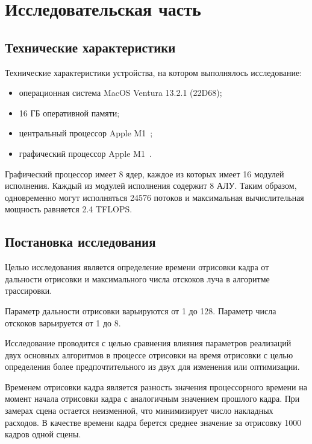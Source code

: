 \chapter{Исследовательская часть}

\section{Технические характеристики}

Технические характеристики устройства, на котором выполнялось исследование:
\begin{itemize}
    \item операционная система MacOS Ventura 13.2.1 (22D68);
    \item 16 ГБ оперативной памяти;
    \item центральный процессор Apple M1~\cite{M1};
    \item графический процессор Apple M1~\cite{M1}.
\end{itemize}

Графический процессор имеет 8 ядер, каждое из которых имеет 16 модулей 
исполнения. Каждый из модулей исполнения содержит 8 АЛУ. Таким образом, 
одновременно могут исполняться 24576 потоков и максимальная вычислительная мощность
равняется 2.4 TFLOPS.


\section{Постановка исследования}

Целью исследования является определение времени отрисовки кадра 
от дальности отрисовки и максимального числа отскоков луча в алгоритме трассировки.

Параметр дальности отрисовки варьируются от 1 до 128. Параметр числа отскоков 
варьируется от 1 до 8.

Исследование проводится с целью сравнения влияния параметров реализаций двух 
основных алгоритмов в процессе отрисовки на время отрисовки с целью определения
более предпочтительного из двух для изменения или оптимизации.

Временем отрисовки кадра является разность значения процессорного времени на момент начала 
отрисовки кадра с 
аналогичным значением прошлого кадра. При замерах сцена остается неизменной, что
минимизирует число накладных расходов. В качестве времени кадра берется
среднее значение за отрисовку 1000 кадров одной сцены.

